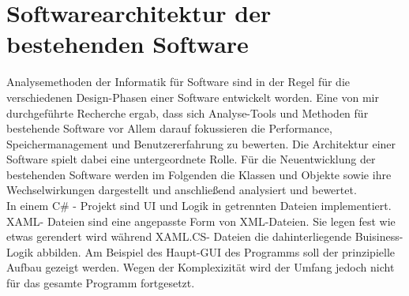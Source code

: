 

\chapter{Softwarearchitektur der bestehenden Software}

    Analysemethoden der Informatik für Software sind in der Regel für die verschiedenen Design-Phasen einer Software entwickelt worden. Eine von mir durchgeführte Recherche ergab,
    dass sich Analyse-Tools und Methoden für bestehende Software vor Allem darauf fokussieren die Performance, Speichermanagement und Benutzererfahrung zu bewerten.
    Die Architektur einer Software spielt dabei eine untergeordnete Rolle.
    Für die Neuentwicklung der bestehenden Software werden im Folgenden die Klassen und Objekte sowie ihre Wechselwirkungen dargestellt und anschließend analysiert und bewertet.
    \\
    In einem C\# - Projekt sind UI und Logik in getrennten Dateien implementiert. XAML- Dateien sind eine angepasste Form von XML-Dateien. Sie legen fest wie etwas gerendert wird während
    XAML.CS- Dateien die dahinterliegende Buisiness-Logik abbilden.
    Am Beispiel des Haupt-GUI des Programms soll der prinzipielle Aufbau gezeigt werden. Wegen der Komplexizität wird der Umfang jedoch nicht für das gesamte Programm fortgesetzt.
